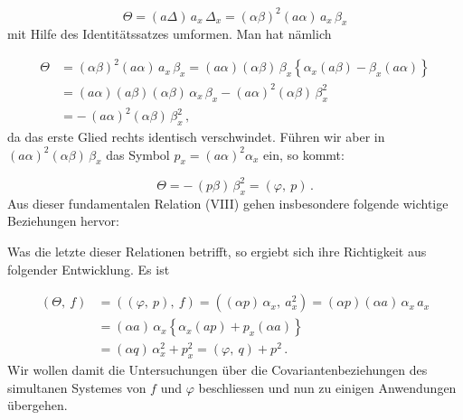 \[
\Theta = (a\Delta)\,a_x\,\Delta_x = (\alpha\beta)^2(a\alpha)\,a_x\,\beta_x
\]
mit Hilfe des Identitätssatzes umformen. Man hat nämlich

\[
\begin{aligned}
\Theta &= (\alpha\beta)^2(a\alpha)\,a_x\,\beta_x = (a\alpha)(\alpha\beta)\,\beta_x\left\{\alpha_x(a\beta) - \beta_x(a\alpha)\right\}\\
&= (a\alpha)(a\beta)(\alpha\beta)\,\alpha_x\,\beta_x - (a\alpha)^2(\alpha\beta)\,\beta_x^2\\
&= -\,(a\alpha)^2(\alpha\beta)\,\beta_x^2\,,
\end{aligned}
\]
da das erste Glied rechts identisch verschwindet. Führen wir aber in
$(a\alpha)^2(\alpha\beta)\,\beta_x$ das Symbol $p_x = (a\alpha)^2\alpha_x$
ein, so kommt:

\[
\Theta = -\,(p\beta)\,\beta_x^2 = (\varphi,\ p)\,.
\]
Aus dieser fundamentalen Relation (VIII) gehen insbesondere folgende
wichtige Beziehungen hervor:


Was die letzte dieser Relationen betrifft, so ergiebt sich ihre
Richtigkeit aus folgender Entwicklung. Es ist

\[
\begin{aligned}
(\Theta,\ f) &= ((\varphi,\ p),\ f) = ((\alpha p)\,\alpha_x,\ a_x^2) = (\alpha p)(\alpha a)\,\alpha_x\,a_x\\
&= (\alpha a)\,\alpha_x\left\{\alpha_x(ap) + p_x(\alpha a)\right\}\\
&= (\alpha q)\,\alpha_x^2 + p_x^2 = (\varphi,\ q) + p^2\,.
\end{aligned}
\]
Wir wollen damit die Untersuchungen über die Covariantenbeziehungen des
simultanen Systemes von $f$ und $\varphi$ beschliessen und nun zu einigen
Anwendungen übergehen.


